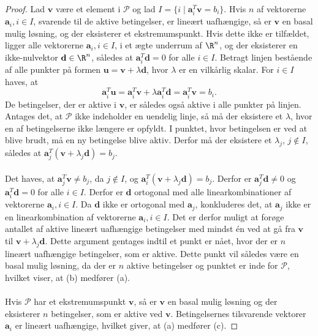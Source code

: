 \begin{proof}
Lad $\textbf{v}$ være et element i $\mathcal{P}$ og lad $I = \{ i \mid \textbf{a}_i^T\textbf{v} = b_i \}$.
Hvis $n$ af vektorerne  $\textbf{a}_i, i \in I$, svarende til de aktive betingelser, er lineært uafhængige, så er $\textbf{v}$ en basal mulig løsning, og der eksisterer et ekstremumspunkt.
Hvis dette ikke er tilfældet, ligger alle vektorerne $\textbf{a}_i, i \in I$, i et ægte underrum af $\R^n$, og der eksisterer en ikke-nulvektor $\textbf{d} \in \R^n$, således at $\textbf{a}_i^T\textbf{d} = 0$ for alle $i \in I$.
Betragt linjen bestående af alle punkter på formen $\textbf{u} = \textbf{v} + \lambda \textbf{d}$, hvor $\lambda$ er en vilkårlig skalar.
For $i \in I$ haves, at $$\textbf{a}_i^T\textbf{u} = \textbf{a}_i^T\textbf{v} + \lambda \textbf{a}_i^T\textbf{d} = \textbf{a}_i^T\textbf{v} = b_i.$$
De betingelser, der er aktive i $\textbf{v}$, er således også aktive i alle punkter på linjen.
Antages det, at $\mathcal{P}$ ikke indeholder en uendelig linje, så må der eksistere et $\lambda$, hvor en af betingelserne ikke længere er opfyldt.
I punktet, hvor betingelsen er ved at blive brudt, må en ny betingelse blive aktiv.
Derfor må der eksistere et $\lambda_j$, $j \notin I$, således at $\textbf{a}_j^T (\textbf{v} + \lambda_j\textbf{d}) = b_j$.\\\\
%
Det haves, at $\textbf{a}_j^T\textbf{v} \neq b_j$, da $j \notin I$, og $\textbf{a}_i^T (\textbf{v} + \lambda_j\textbf{d}) = b_j$.
Derfor er $\textbf{a}_j^T\textbf{d} \neq 0$ og $\textbf{a}_i^T\textbf{d} = 0$ for alle $i \in I$.
Derfor er $\textbf{d}$ ortogonal med alle linearkombinationer af vektorerne $\textbf{a}_i, i\in I$.
Da $\textbf{d}$ ikke er ortogonal med $\textbf{a}_j$, konkluderes det, at $\textbf{a}_j$ ikke er en linearkombination af vektorerne $\textbf{a}_i, i \in I$.
Det er derfor muligt at forøge antallet af aktive lineært uafhængige betingelser med mindst én ved at gå fra $\textbf{v}$ til $\textbf{v} + \lambda_j\textbf{d}$.
Dette argument gentages indtil et punkt er nået, hvor der er $n$ lineært uafhængige betingelser, som er aktive.
Dette punkt vil således være en basal mulig løsning, da der er $n$ aktive betingelser og punktet er inde for $\mathcal{P}$, hvilket viser, at (b) medfører (a).\\\\
%
Hvis $\mathcal{P}$ har et ekstremumspunkt $\textbf{v}$, så er $\textbf{v}$ en basal mulig løsning og der eksisterer $n$ betingelser, som er aktive ved $\textbf{v}$.
Betingelsernes tilsvarende vektorer $\textbf{a}_i$ er lineært uafhængige, hvilket giver, at (a) medfører (c).

\end{proof}
